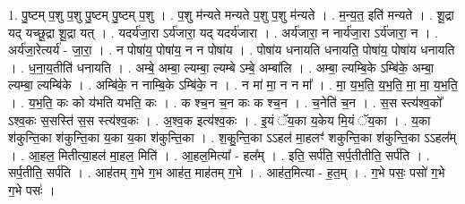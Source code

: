 \documentclass[17pt]{extarticle}
\begin{document}
1. पु॒ष्टम् प॒शु प॒शु पु॒ष्टम् पु॒ष्टम् प॒शु । . प॒शु म॑न्यते मन्यते प॒शु प॒शु म॑न्यते । . म॒न्य॒त॒ इति॑ मन्यते । . शू॒द्रा यद् यच्छू॒द्रा शू॒द्रा यत् । . यदर्य॑जा॒रा ऽर्य॑जारा॒ यद् यदर्य॑जारा । . अर्य॑जारा॒ न नार्य॑जा॒रा ऽर्य॑जारा॒ न । . अर्य॑जा॒रेत्यर्य॑ - जा॒रा॒ । . न पोषा॑य॒ पोषा॑य॒ न न पोषा॑य । . पोषा॑य धनायति धनायति॒ पोषा॑य॒ पोषा॑य धनायति । . ध॒ना॒य॒तीति॑ धनायति । . अम्बे॒ अम्बा॒ ल्यम्बा॒ ल्यम्बे ऽम्बे॒ अम्बा॑लि । . अम्बा॒ ल्यम्बि॒के ऽम्बि॑के॒ अम्बा॒ ल्यम्बा॒ ल्यम्बि॑के । . अम्बि॑के॒ न नाम्बि॒के ऽम्बि॑के॒ न । . न मा॑ मा॒ न न मा᳚ । . मा॒ य॒भ॒ति॒ य॒भ॒ति॒ मा॒ मा॒ य॒भ॒ति॒ । . य॒भ॒ति॒ कः को य॑भति यभति॒ कः । . क श्च॒न च॒न कः क श्च॒न । . च॒नेति॑ च॒न । . स॒स स्त्य॑श्व॒को᳚ ऽश्व॒कः स॒सस्ति॑ स॒स स्त्य॑श्व॒कः । . अ॒श्व॒क इत्य॑श्व॒कः । . इ॒यं ॅय॒का य॒केय मि॒यं ॅय॒का । . य॒का श॑कुन्ति॒का श॑कुन्ति॒का य॒का य॒का श॑कुन्ति॒का । . श॒कु॒न्ति॒का ऽऽहल॑ मा॒हलꣳ॑ शकुन्ति॒का श॑कुन्ति॒का ऽऽहल᳚म् । . आ॒हल॒ मितीत्या॒हल॑ मा॒हल॒ मिति॑ । . आ॒हल॒मित्या᳚ - हल᳚म् । . इति॒ सर्प॑ति॒ सर्प॒तीतीति॒ सर्प॑ति । . सर्प॒तीति॒ सर्प॑ति । . आह॑तम् ग॒भे ग॒भ आह॑त॒ माह॑तम् ग॒भे । . आह॑त॒मित्या - ह॒त॒म् । . ग॒भे पसः॒ पसो॑ ग॒भे ग॒भे पसः॑ । \newline
\end{document}

